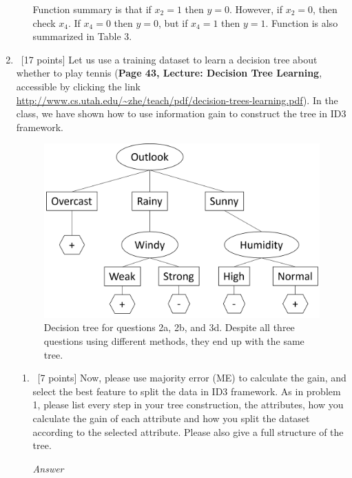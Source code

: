 \documentclass[12pt, fullpage,letterpaper]{article}
\begin{document}
\begin{enumerate}
\begin{enumerate}
Function summary is that if $x_2=1$ then $y=0$. However, if $x_2=0$, then check $x_4$. If $x_4=0$ then $y=0$, but if $x_4=1$ then $y=1$. Function is also summarized in Table 3.

\end{enumerate}

\item~[17 points] Let us use a training dataset to learn a decision tree about whether to play tennis (\textbf{Page 43, Lecture: Decision Tree Learning}, accessible by clicking the link \href{http://www.cs.utah.edu/~zhe/teach/pdf/decision-trees-learning.pdf}{http://www.cs.utah.edu/\textasciitilde zhe/teach/pdf/decision-trees-learning.pdf}). In the class, we have shown how to use information gain to construct the tree in ID3 framework.  

\begin{figure}[htp]
    \centering
    \includegraphics[width=12cm]{q2ab-q3d.png}
    \caption{Decision tree for questions 2a, 2b, and 3d. Despite all three questions using different methods, they end up with the same tree.}
    \label{fig:Q3-Decision-Tree}
\end{figure}

\begin{enumerate}
	\item~[7 points] Now, please use majority error (ME) to calculate the gain, and select the best feature to split the data in ID3 framework. As in problem 1, please list every step in your tree construction,  the attributes,  how you calculate the gain of each attribute and how you split the dataset according to the selected attribute. Please also give a full structure of the tree.
	
	\emph{Answer}
	

\end{enumerate}
\end{enumerate}
\end{document}
